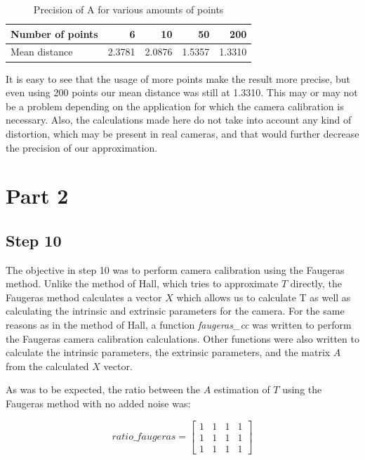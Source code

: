 \documentclass[journal]{IEEEtran}
\begin{document}
\begin{table}[H]
	\caption{Precision of A for various amounts of points}
	\centering
	\begin{tabular}{l | r r r r}\label{hakuna}
		Number of points & 6 & 10 & 50 & 200 \\
		\hline
		Mean distance & 2.3781 & 2.0876 & 1.5357 & 1.3310 \\
	\end{tabular}
\end{table}

It is easy to see that the usage of more points make the result more precise, but even using 200 points our mean distance was still at 1.3310. This may or may not be a problem depending on the application for which the camera calibration is necessary. Also, the calculations made here do not take into account any kind of distortion, which may be present in real cameras, and that would further decrease the precision of our approximation.

\section{Part 2}\label{p2}


\subsection{Step 10}

The objective in step 10 was to perform camera calibration using the Faugeras method. Unlike the method of Hall, which tries to approximate $T$ directly, the Faugeras method calculates a vector $X$ which allows us to calculate T as well as calculating the intrinsic and extrinsic parameters for the camera. For the same reasons as in the method of Hall, a function \textit{faugeras\_cc} was written to perform the Faugeras camera calibration calculations. Other functions were also written to calculate the intrinsic parameters, the extrinsic parameters, and the matrix $A$ from the calculated $X$ vector.

As was to be expected, the ratio between the $A$ estimation of $T$ using the Faugeras method with no added noise was:

\[
ratio\_faugeras = 
\begin{bmatrix}
    1 & 1 & 1 & 1 \\
    1 & 1 & 1 & 1 \\
    1 & 1 & 1 & 1 
\end{bmatrix}
\]
\end{document}
